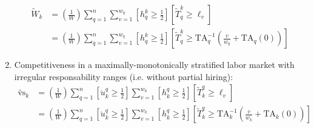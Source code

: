 \documentclass[hidelinks, nonatbib]{elsarticle}
\begin{document}
\begin{enumerate}
    \begin{align}
        \tilde{W}_k 
        &=
        \left(
            \frac{1}{W}
        \right)
        \sum_{q=1}^{n}
        \sum_{v=1}^{w_q}
        \left[
            h_{q}^{k}
            \geq
            \frac{1}{2}
        \right]
        \left[
            \tilde{T}_{q}^{k}
            \geq
            \ell_v
        \right]
        \\
        &=
        \left(
            \frac{1}{W}
        \right)
        \sum_{q=1}^{n}
        \sum_{v=1}^{w_q}
        \left[
            h_{q}^{k}
            \geq
            \frac{1}{2}
        \right]
        \left[
            \tilde{T}_{q}^{k}
            \geq
            \text{TA}_{q}^{-1}
            \left(
                \frac{v}{w_q}
                +
                \text{TA}_{q}(0)
            \right)
        \right]
    \end{align}
    
    \item Competitiveness in a maximally-monotonically stratified labor market with irregular responsability ranges (i.e. without partial hiring):
    \begin{align}
        \tilde{\text{vs}}_k 
        &=
        \left(
            \frac{1}{W}
        \right)
        \sum_{q=1}^{n}
        \left[
            \ddot{u}_{k}^{q}
            \geq
            \frac{1}{2}
        \right]
        \sum_{v=1}^{w_k}
        \left[
            h_{k}^{q}
            \geq
            \frac{1}{2}
        \right]
        \left[
            \tilde{T}_{k}^{q}
            \geq
            \ell_v
        \right]
        \\
        &=
        \left(
            \frac{1}{W}
        \right)
        \sum_{q=1}^{n}
        \left[
            \ddot{u}_{k}^{q}
            \geq
            \frac{1}{2}
        \right]
        \sum_{v=1}^{w_k}
        \left[
            h_{k}^{q}
            \geq
            \frac{1}{2}
        \right]
        \left[
            \tilde{T}_{k}^{q}
            \geq
            \text{TA}_{k}^{-1}
            \left(
                \frac{v}{w_k}
                +
                \text{TA}_{k}(0)
            \right)
        \right]
    \end{align}
\end{enumerate}
\end{document}
